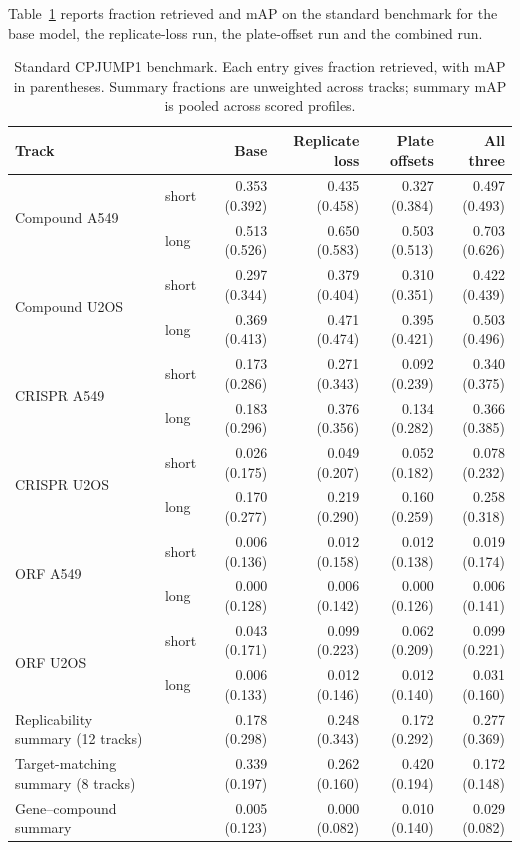 Table~\ref{tab:benchmark} reports fraction retrieved and mAP on the standard benchmark for the base
model, the replicate-loss run, the plate-offset run and the combined run.

\begin{table}[t]
  \centering
  \caption{Standard CPJUMP1 benchmark. Each entry gives fraction retrieved, with mAP in
    parentheses. Summary fractions are unweighted across tracks; summary mAP is pooled across
    scored profiles.}
  \label{tab:benchmark}
  \begin{tabular}{@{}llrrrr@{}}
    \toprule
    Track & & Base & Replicate loss & Plate offsets & All three \\
    \midrule
    \multirow{2}{*}{Compound A549} & short
    & 0.353 (0.392) & 0.435 (0.458) & 0.327 (0.384) & 0.497 (0.493) \\
    & long
    & 0.513 (0.526) & 0.650 (0.583) & 0.503 (0.513) & 0.703 (0.626) \\
    \multirow{2}{*}{Compound U2OS} & short
    & 0.297 (0.344) & 0.379 (0.404) & 0.310 (0.351) & 0.422 (0.439) \\
    & long
    & 0.369 (0.413) & 0.471 (0.474) & 0.395 (0.421) & 0.503 (0.496) \\
    \multirow{2}{*}{CRISPR A549} & short
    & 0.173 (0.286) & 0.271 (0.343) & 0.092 (0.239) & 0.340 (0.375) \\
    & long
    & 0.183 (0.296) & 0.376 (0.356) & 0.134 (0.282) & 0.366 (0.385) \\
    \multirow{2}{*}{CRISPR U2OS} & short
    & 0.026 (0.175) & 0.049 (0.207) & 0.052 (0.182) & 0.078 (0.232) \\
    & long
    & 0.170 (0.277) & 0.219 (0.290) & 0.160 (0.259) & 0.258 (0.318) \\
    \multirow{2}{*}{ORF A549} & short
    & 0.006 (0.136) & 0.012 (0.158) & 0.012 (0.138) & 0.019 (0.174) \\
    & long
    & 0.000 (0.128) & 0.006 (0.142) & 0.000 (0.126) & 0.006 (0.141) \\
    \multirow{2}{*}{ORF U2OS} & short
    & 0.043 (0.171) & 0.099 (0.223) & 0.062 (0.209) & 0.099 (0.221) \\
    & long
    & 0.006 (0.133) & 0.012 (0.146) & 0.012 (0.140) & 0.031 (0.160) \\
    \midrule
    Replicability summary (12 tracks) &
    & 0.178 (0.298) & 0.248 (0.343) & 0.172 (0.292) & 0.277 (0.369) \\
    Target-matching summary (8 tracks) &
    & 0.339 (0.197) & 0.262 (0.160) & 0.420 (0.194) & 0.172 (0.148) \\
    Gene--compound summary &
    & 0.005 (0.123) & 0.000 (0.082) & 0.010 (0.140) & 0.029 (0.082) \\
    \bottomrule
  \end{tabular}
\end{table}

